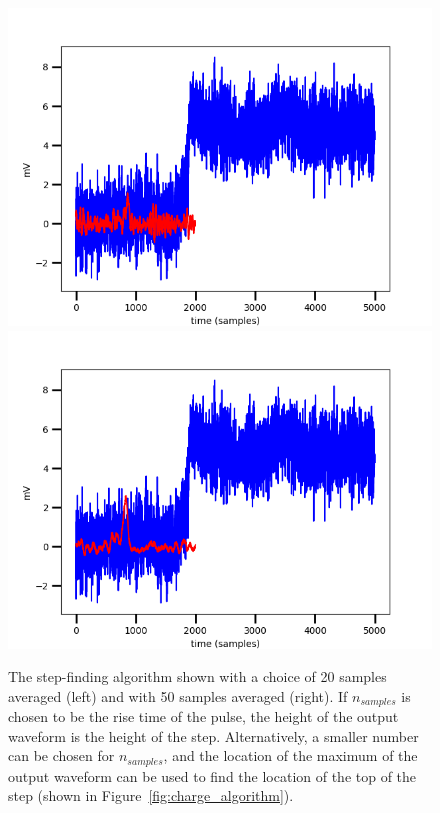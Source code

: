  \begin{figure}[htbp]
\begin{center}
\includegraphics[width =\halffig ]{figures/testbed/figure_q20.png}
\includegraphics[width =\halffig ]{figures/testbed/figure_q50.png}
\caption{The step-finding algorithm shown with a choice of 20 samples averaged (left) and with 50 samples averaged (right). If $n_{samples}$ is chosen to be the rise time of the pulse, the height of the output waveform is the height of the step. Alternatively, a smaller number can be chosen for $n_{samples}$, and the location of the maximum of the output waveform can be used to find the location of the top of the step (shown in Figure~\ref{fig:charge_algorithm}). }
\label{fig:nsamp_choice}
\end{center}
\end{figure}

